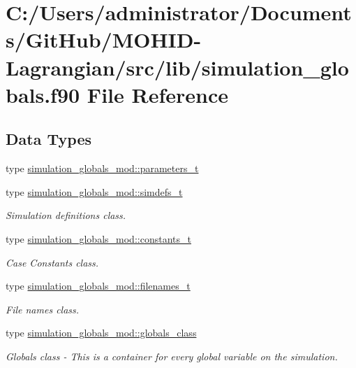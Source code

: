 \hypertarget{simulation__globals_8f90}{}\section{C\+:/\+Users/administrator/\+Documents/\+Git\+Hub/\+M\+O\+H\+I\+D-\/\+Lagrangian/src/lib/simulation\+\_\+globals.f90 File Reference}
\label{simulation__globals_8f90}
\subsection*{Data Types}
\begin{DoxyCompactItemize}
\item 
type \mbox{\hyperlink{structsimulation__globals__mod_1_1parameters__t}{simulation\+\_\+globals\+\_\+mod\+::parameters\+\_\+t}}
\item 
type \mbox{\hyperlink{structsimulation__globals__mod_1_1simdefs__t}{simulation\+\_\+globals\+\_\+mod\+::simdefs\+\_\+t}}
\begin{DoxyCompactList}\small\item\em Simulation definitions class. \end{DoxyCompactList}\item 
type \mbox{\hyperlink{structsimulation__globals__mod_1_1constants__t}{simulation\+\_\+globals\+\_\+mod\+::constants\+\_\+t}}
\begin{DoxyCompactList}\small\item\em Case Constants class. \end{DoxyCompactList}\item 
type \mbox{\hyperlink{structsimulation__globals__mod_1_1filenames__t}{simulation\+\_\+globals\+\_\+mod\+::filenames\+\_\+t}}
\begin{DoxyCompactList}\small\item\em File names class. \end{DoxyCompactList}\item 
type \mbox{\hyperlink{structsimulation__globals__mod_1_1globals__class}{simulation\+\_\+globals\+\_\+mod\+::globals\+\_\+class}}
\begin{DoxyCompactList}\small\item\em Globals class -\/ This is a container for every global variable on the simulation. \end{DoxyCompactList}\end{DoxyCompactItemize}

